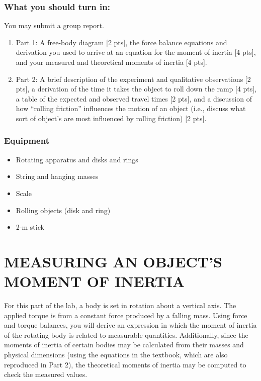 \documentclass[11pt,letterpaper]{article}
\begin{document}
\subsubsection*{What you should turn in:} 
You may submit a group report.
\begin{enumerate}
\setlength{\parskip}{3pt}
\item Part 1: A free-body diagram [2 pts], the force balance equations and derivation you used to arrive at an equation for the moment of inertia [4 pts], and your measured and theoretical moments of inertia [4 pts].
\item Part 2: A brief description of the experiment and qualitative observations [2 pts], a derivation of the time it takes the object to roll down the ramp [4 pts], a table of the expected and observed travel times [2 pts], and a discussion of how ``rolling friction'' influences the motion of an object (i.e., discuss what sort of object's are most influenced by rolling friction) [2 pts].
\end{enumerate}

\subsubsection*{Equipment}
\begin{itemize}
\setlength{\parskip}{3pt}
\item Rotating apparatus and disks and rings
\item String and hanging masses
\item Scale
\item Rolling objects (disk and ring)
\item 2-m stick
\end{itemize}

\section{MEASURING AN OBJECT'S MOMENT OF INERTIA}
For this part of the lab, a body is set in rotation about a vertical axis.  The applied
torque is from a constant force produced by a falling mass. Using force and torque balances, you will derive an expression in which the moment of inertia of the rotating body is related to measurable quantities. Additionally, since the moments of inertia of certain bodies may be calculated from their masses and physical dimensions (using the equations in the textbook, which are also reproduced in Part 2), the theoretical moments of inertia may be computed to check the measured values.
\end{document}
